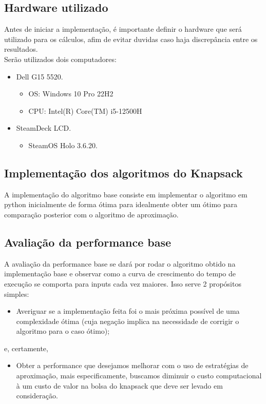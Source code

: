 \documentclass{article}
\begin{document}
    \subsection{Hardware utilizado}
        Antes de iniciar a implementação, é importante definir o hardware que será utilizado para os cálculos, afim de evitar duvidas caso haja discrepância entre os resultados.\\
        Serão utilizados dois computadores:
        \begin{itemize}
            \item Dell G15 5520.
                \begin{itemize}
                    \item OS: Windows 10 Pro 22H2
                    \item CPU: Intel(R) Core(TM) i5-12500H
                \end{itemize}
                
            \item SteamDeck LCD.
                \begin{itemize}
                    \item SteamOS Holo 3.6.20.
                \end{itemize}
        \end{itemize}
    
    \subsection{Implementação dos algoritmos do Knapsack}
        A implementação do algoritmo base consiste em implementar o algoritmo em python inicialmente de forma ótima para idealmente obter um ótimo para comparação posterior com o algoritmo de aproximação. 
    
    \subsection{Avaliação da performance base}
        A avaliação da performance base se dará por rodar o algoritmo obtido na implementação base e observar como a curva de crescimento do tempo de execução se comporta para inputs cada vez maiores. Isso serve 2 propósitos simples:
        \begin{itemize}
            \item Averiguar se a implementação feita foi o mais próxima possível de uma complexidade ótima (cuja negação implica na necessidade de corrigir o algoritmo para o caso ótimo);
        \end{itemize}
        e, certamente,
        \begin{itemize}
            \item Obter a performance que desejamos melhorar com o uso de estratégias de aproximação, mais especificamente, buscamos diminuir o custo computacional à um custo de valor na bolsa do knapsack que deve ser levado em consideração.
        \end{itemize}
        
\end{document}
